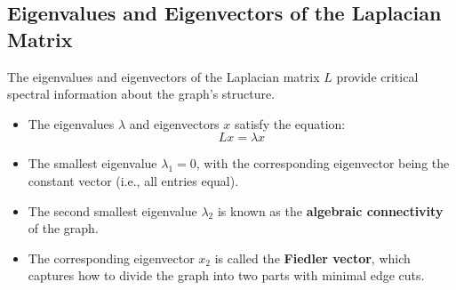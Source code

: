 \documentclass[hidelinks,12pt]{article}
\begin{document}
\begin{figure}[h!]
\centering
{}
\end{figure}

\subsection{Eigenvalues and Eigenvectors of the Laplacian Matrix}
The eigenvalues and eigenvectors of the Laplacian matrix \( L \) provide critical spectral information about the graph's structure.

\begin{itemize}
    \item The eigenvalues \( \lambda \) and eigenvectors \( x \) satisfy the equation:
    \[
    Lx = \lambda x
    \]
    \item The smallest eigenvalue \( \lambda_1 = 0 \), with the corresponding eigenvector being the constant vector (i.e., all entries equal).
    \item The second smallest eigenvalue \( \lambda_2 \) is known as the \textbf{algebraic connectivity} of the graph.
    \item The corresponding eigenvector \( x_2 \) is called the \textbf{Fiedler vector}, which captures how to divide the graph into two parts with minimal edge cuts.
\end{itemize}
\end{document}
